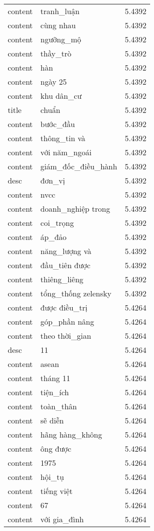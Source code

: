 \documentclass{article}
\begin{document}
\begin{tabular}{lll}
content & tranh\_luận & 5.4392\\
content & cùng nhau & 5.4392\\
content & ngưỡng\_mộ & 5.4392\\
content & thầy\_trò & 5.4392\\
content & hàn & 5.4392\\
content & ngày 25 & 5.4392\\
content & khu dân\_cư & 5.4392\\
title & chuẩn & 5.4392\\
content & bước\_đầu & 5.4392\\
content & thông\_tin và & 5.4392\\
content & với năm\_ngoái & 5.4392\\
content & giám\_đốc\_điều\_hành & 5.4392\\
desc & đơn\_vị & 5.4392\\
content & nvcc & 5.4392\\
content & doanh\_nghiệp trong & 5.4392\\
content & coi\_trọng & 5.4392\\
content & áp\_đảo & 5.4392\\
content & năng\_lượng và & 5.4392\\
content & đầu\_tiên được & 5.4392\\
content & thiêng\_liêng & 5.4392\\
content & tổng\_thống zelensky & 5.4392\\
content & được điều\_trị & 5.4264\\
content & góp\_phần nâng & 5.4264\\
content & theo thời\_gian & 5.4264\\
desc & 11 & 5.4264\\
content & asean & 5.4264\\
content & tháng 11 & 5.4264\\
content & tiện\_ích & 5.4264\\
content & toàn\_thân & 5.4264\\
content & sẽ diễn & 5.4264\\
content & hãng hàng\_không & 5.4264\\
content & ông được & 5.4264\\
content & 1975 & 5.4264\\
content & hội\_tụ & 5.4264\\
content & tiếng việt & 5.4264\\
content & 67 & 5.4264\\
content & với gia\_đình & 5.4264\\

\end{tabular}
\end{document}
